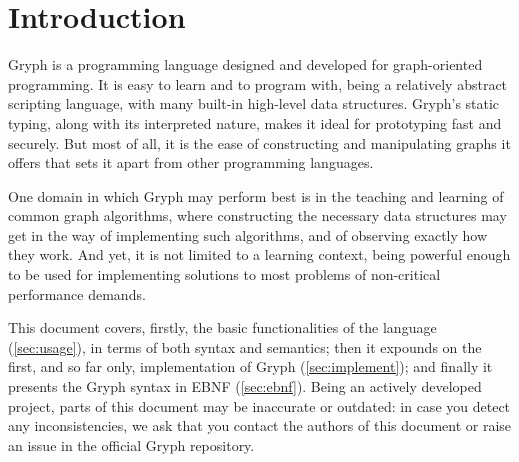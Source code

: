 \section{Introduction}
\label{sec:intro}
Gryph is a programming language designed and developed for graph-oriented programming. It is easy to learn and to program with, being a relatively abstract scripting language, with many built-in high-level data structures. Gryph's static typing, along with its interpreted nature, makes it ideal for prototyping fast and securely. But most of all, it is the ease of constructing and manipulating graphs it offers that sets it apart from other programming languages.

One domain in which Gryph may perform best is in the teaching and learning of common graph algorithms, where constructing the necessary data structures may get in the way of implementing such algorithms, and of observing exactly how they work. And yet, it is not limited to a learning context, being powerful enough to be used for implementing solutions to most problems of non-critical performance demands.

This document covers, firstly, the basic functionalities of the language (\autoref{sec:usage}), in terms of both syntax and semantics; then it expounds on the first, and so far only, implementation of Gryph (\autoref{sec:implement}); and finally it presents the Gryph syntax in EBNF (\autoref{sec:ebnf}). Being an actively developed project, parts of this document may be inaccurate or outdated: in case you detect any inconsistencies, we ask that you contact the authors of this document or raise an issue in the official Gryph repository.